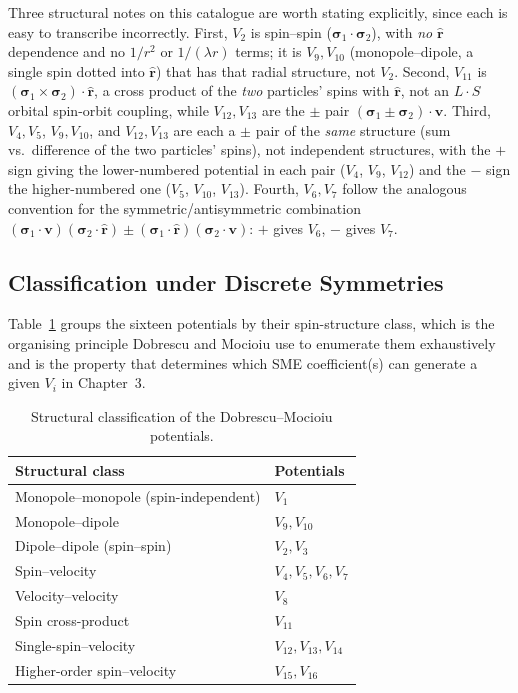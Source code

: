 \documentclass[main]{subfiles}
\begin{document}
Three structural notes on this catalogue are worth stating explicitly, since
each is easy to transcribe incorrectly. First, $V_2$ is spin--spin ($\boldsymbol\sigma_1\cdot\boldsymbol\sigma_2$),
with \emph{no} $\hat{\mathbf r}$ dependence and no $1/r^2$ or $1/(\lambda r)$
terms; it is $V_9,V_{10}$ (monopole--dipole, a single spin dotted into
$\hat{\mathbf r}$) that has that radial structure, not $V_2$. Second,
$V_{11}$ is $(\boldsymbol\sigma_1\times\boldsymbol\sigma_2)\cdot\hat{\mathbf r}$,
a cross product of the \emph{two} particles' spins with $\hat{\mathbf r}$,
not an $L\cdot S$ orbital spin-orbit coupling, while $V_{12},V_{13}$ are the
$\pm$ pair $(\boldsymbol\sigma_1\pm\boldsymbol\sigma_2)\cdot\mathbf v$.
Third, $V_4,V_5$, $V_9,V_{10}$, and $V_{12},V_{13}$ are each a $\pm$ pair of
the \emph{same} structure (sum vs.\ difference of the two particles' spins),
not independent structures, with the $+$ sign giving the lower-numbered
potential in each pair ($V_4$, $V_9$, $V_{12}$) and the $-$ sign the
higher-numbered one ($V_5$, $V_{10}$, $V_{13}$). Fourth, $V_6,V_7$ follow the
analogous convention for the symmetric/antisymmetric combination
$(\boldsymbol\sigma_1\cdot\mathbf v)(\boldsymbol\sigma_2\cdot\hat{\mathbf r})
\pm(\boldsymbol\sigma_1\cdot\hat{\mathbf r})(\boldsymbol\sigma_2\cdot\mathbf v)$:
$+$ gives $V_6$, $-$ gives $V_7$.

\subsection{Classification under Discrete Symmetries}

Table~\ref{tab:dm-classification} groups the sixteen potentials by their
spin-structure class, which is the organising principle Dobrescu and Mocioiu
use to enumerate them exhaustively and is the property that determines
which SME coefficient(s) can generate a given $V_i$ in Chapter~3.

\begin{table}[h]
\centering
\begin{tabular}{@{}ll@{}}
\toprule
Structural class & Potentials \\
\midrule
Monopole--monopole (spin-independent) & $V_1$ \\
Monopole--dipole & $V_9, V_{10}$ \\
Dipole--dipole (spin--spin) & $V_2, V_3$ \\
Spin--velocity & $V_4, V_5, V_6, V_7$ \\
Velocity--velocity & $V_8$ \\
Spin cross-product & $V_{11}$ \\
Single-spin--velocity & $V_{12}, V_{13}, V_{14}$ \\
Higher-order spin--velocity & $V_{15}, V_{16}$ \\
\bottomrule
\end{tabular}
\caption{Structural classification of the Dobrescu--Mocioiu potentials.}
\label{tab:dm-classification}
\end{table}
\end{document}
